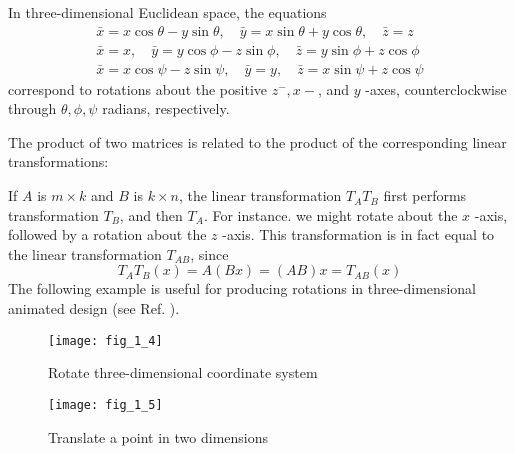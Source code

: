 \documentclass[../main.tex]{subfiles}
\begin{document}
In three-dimensional Euclidean space, the equations
$$
\begin{array}{c}
\bar{x}=x \cos \theta-y \sin \theta, \quad \bar{y}=x \sin \theta+y \cos \theta, \quad \bar{z}=z \\
\bar{x}=x, \quad \bar{y}=y \cos \phi-z \sin \phi, \quad \bar{z}=y \sin \phi+z \cos \phi \\
\bar{x}=x \cos \psi-z \sin \psi, \quad \bar{y}=y, \quad \bar{z}=x \sin \psi+z \cos \psi
\end{array}
$$
correspond to rotations about the positive $z^{-}, x-$, and $y$ -axes, counterclockwise through $\theta, \phi, \psi$ radians, respectively.

The product of two matrices is related to the product of the corresponding linear transformations:

If $A$ is $m \times k$ and $B$ is $k \times n$, the linear transformation $T_{A} T_{B}$ first performs transformation $T_{B}$, and then $T_{A}$. For instance. we might rotate about the $x$ -axis, followed by a rotation about the $z$ -axis. This transformation is in fact equal to the linear transformation $T_{A B}$, since
$$
T_{A} T_{B}(x)=A(B x)=(A B) x=T_{A B}(x)
$$
The following example is useful for producing rotations in three-dimensional animated design (see Ref.  \cite[pp. 97-112]{ref7}).

\begin{figure}
	\centering
	\texttt{[image: fig\_1\_4]}
	\caption{Rotate three-dimensional coordinate system}
	\label{fig:fig_1_4}
\end{figure}

\begin{figure}
	\centering
	\texttt{[image: fig\_1\_5]}
	\caption{Translate a point in two dimensions}
	\label{fig:fig_1_5}
\end{figure}
\end{document}
